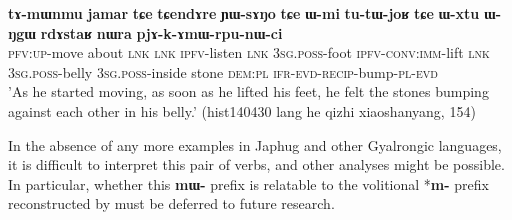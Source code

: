 \documentclass[oneside,a4paper,11pt]{article}
\newcommand{\ipa}[1]{\textbf{{\phon\mbox{#1}}}} %
\begin{document}
\begin{exe}
\ex \label{ex:tAmWnmu}
\gll 
\ipa{tɤ-mɯnmu} \ipa{jamar} 	\ipa{tɕe} 	\ipa{tɕendɤre} 	\ipa{ɲɯ-sɤŋo} 	\ipa{tɕe} 	\ipa{ɯ-mi} 	\ipa{tu-tɯ-joʁ} 	\ipa{tɕe} 	\ipa{ɯ-xtu} 	\ipa{ɯ-ŋgɯ} 	\ipa{rdɤstaʁ} 	\ipa{nɯra} 	\ipa{pjɤ-k-ɤmɯ-rpu-nɯ-ci} \\
\textsc{pfv:up}-move about \textsc{lnk} \textsc{lnk} \textsc{ipfv}-listen \textsc{lnk} \textsc{3sg.poss}-foot \textsc{ipfv-conv:imm}-lift \textsc{lnk} \textsc{3sg.poss}-belly \textsc{3sg.poss}-inside stone \textsc{dem:pl} \textsc{ifr-evd-recip}-bump-\textsc{pl-evd} \\
\glt 'As he started moving, as soon as he lifted his feet, he felt the stones bumping against each other in his belly.' (hist140430 lang he qizhi xiaoshanyang, 154)
\end{exe}



In the absence of any more examples in Japhug and other Gyalrongic languages, it is difficult to interpret this pair of verbs, and other analyses might be possible. In particular, whether this \ipa{mɯ-} prefix is relatable to the volitional *\ipa{m-} prefix reconstructed by \citet[55]{bs14oc} must be deferred to future research.



\end{document}
